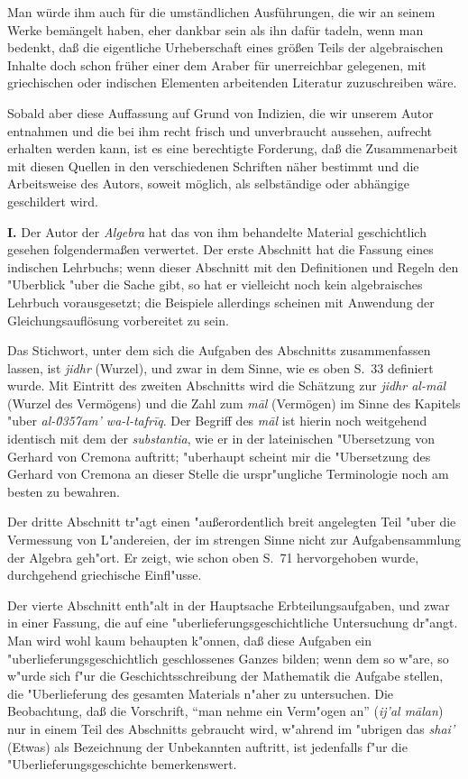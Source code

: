 \documentclass[11pt,a4paper]{article}
\newcommand{\enquote}[1]{``#1''}
\begin{document}
Man w\"urde ihm auch f\"ur die umst\"andlichen Ausf\"uhrungen, die wir an seinem Werke bem\"angelt haben, eher dankbar sein als ihn daf\"ur tadeln, wenn man bedenkt, da\ss{} die eigentliche Urheberschaft eines gr\"o\ss{}en Teils der algebraischen Inhalte doch schon fr\"uher einer dem Araber f\"ur unerreichbar gelegenen, mit griechischen oder indischen Elementen arbeitenden Literatur zuzuschreiben w\"are.

Sobald aber diese Auffassung auf Grund von Indizien, die wir unserem Autor entnahmen und die bei ihm recht frisch und unverbraucht aussehen, aufrecht erhalten werden kann, ist es eine berechtigte Forderung, da\ss{} die Zusammenarbeit mit diesen Quellen in den verschiedenen Schriften n\"aher bestimmt und die Arbeitsweise des Autors, soweit m\"oglich, als selbst\"andige oder abh\"angige geschildert wird.

\textbf{I.} Der Autor der \textit{Algebra} hat das von ihm behandelte Material geschichtlich gesehen folgenderma\ss{}en verwertet. Der erste Abschnitt hat die Fassung eines indischen Lehrbuchs; wenn dieser Abschnitt mit den Definitionen und Regeln den "Uberblick "uber die Sache gibt, so hat er vielleicht noch kein algebraisches Lehrbuch vorausgesetzt; die Beispiele allerdings scheinen mit Anwendung der Gleichungsaufl\"osung vorbereitet zu sein.

Das Stichwort, unter dem sich die Aufgaben des Abschnitts zusammenfassen lassen, ist \textit{jidhr} (Wurzel), und zwar in dem Sinne, wie es oben S.\ 33 definiert wurde. Mit Eintritt des zweiten Abschnitts wird die Sch\"atzung zur \textit{jidhr al-m\=al} (Wurzel des Verm\"ogens) und die Zahl zum \textit{m\=al} (Verm\"ogen) im Sinne des Kapitels "uber \textit{al-\u0357{}am' wa-l-tafr\={i}q}. Der Begriff des \textit{m\=al} ist hierin noch weitgehend identisch mit dem der \textit{substantia}, wie er in der lateinischen "Ubersetzung von Gerhard von Cremona auftritt; "uberhaupt scheint mir die "Ubersetzung des Gerhard von Cremona an dieser Stelle die urspr"ungliche Terminologie noch am besten zu bewahren.

Der dritte Abschnitt tr"agt einen "au\ss{}erordentlich breit angelegten Teil "uber die Vermessung von L"andereien, der im strengen Sinne nicht zur Aufgabensammlung der Algebra geh"ort. Er zeigt, wie schon oben S.\ 71 hervorgehoben wurde, durchgehend griechische Einfl"usse.

Der vierte Abschnitt enth"alt in der Hauptsache Erbteilungsaufgaben, und zwar in einer Fassung, die auf eine "uberlieferungsgeschichtliche Untersuchung dr"angt. Man wird wohl kaum behaupten k"onnen, da\ss{} diese Aufgaben ein "uberlieferungsgeschichtlich geschlossenes Ganzes bilden; wenn dem so w"are, so w"urde sich f"ur die Geschichtsschreibung der Mathematik die Aufgabe stellen, die "Uberlieferung des gesamten Materials n"aher zu untersuchen. Die Beobachtung, da\ss{} die Vorschrift, \enquote{man nehme ein Verm"ogen an} (\textit{ij'al m\=alan}) nur in einem Teil des Abschnitts gebraucht wird, w"ahrend im "ubrigen das \textit{shai'} (Etwas) als Bezeichnung der Unbekannten auftritt, ist jedenfalls f"ur die "Uberlieferungsgeschichte bemerkenswert.
\end{document}
